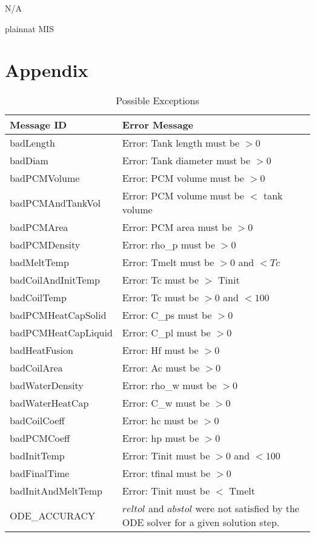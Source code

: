 \documentclass[12pt, titlepage]{article}
\begin{document}
N/A

\newpage

 {plainnat}
 {MIS}

\newpage

\section{Appendix} \label{Appendix}

\renewcommand{\arraystretch}{1.2}

\begin{longtable}{l p{12cm}}
\caption{Possible Exceptions} \\
\toprule
\textbf{Message ID} & \textbf{Error Message} \\
\midrule
badLength & Error: Tank length must be $> 0$ \\
badDiam & Error: Tank diameter must be $> 0$ \\
badPCMVolume & Error: PCM volume must be $> 0$ \\
badPCMAndTankVol & Error: PCM volume must be $<$ tank volume \\
badPCMArea & Error: PCM area must be $> 0$ \\
badPCMDensity & Error: rho\_p must be $> 0$ \\
badMeltTemp & Error: Tmelt must be $> 0$ and $< Tc$ \\
badCoilAndInitTemp & Error: Tc must be $>$ Tinit \\
badCoilTemp & Error: Tc must be $> 0$ and $< 100$ \\
badPCMHeatCapSolid & Error: C\_ps must be $> 0$ \\
badPCMHeatCapLiquid & Error: C\_pl must be $> 0$ \\
badHeatFusion & Error: Hf must be $> 0$ \\
badCoilArea & Error: Ac must be $> 0$ \\
badWaterDensity & Error: rho\_w must be $> 0$ \\
badWaterHeatCap & Error: C\_w must be $> 0$ \\
badCoilCoeff & Error: hc must be $> 0$ \\
badPCMCoeff & Error: hp must be $> 0$ \\
badInitTemp & Error: Tinit must be $> 0$ and $< 100$ \\
badFinalTime & Error: tfinal must be $> 0$ \\
badInitAndMeltTemp & Error: Tinit must be $<$ Tmelt \\
ODE\_ACCURACY & $reltol$ and $abstol$ were not satisfied by the ODE solver for a given solution step. \\

\end{longtable}
\end{document}
